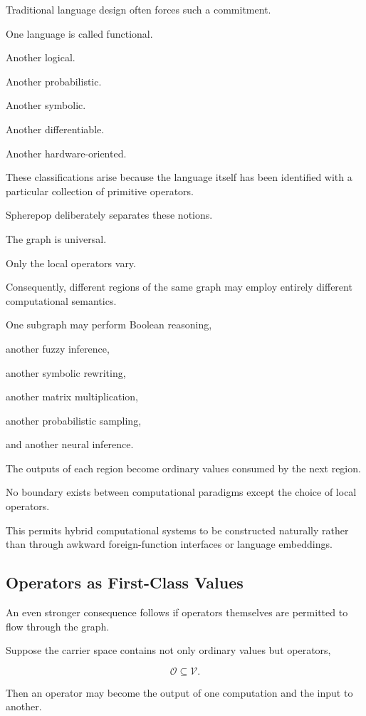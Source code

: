 \documentclass[12pt,oneside]{article}
\begin{document}
Traditional language design often forces such a commitment.

One language is called functional.

Another logical.

Another probabilistic.

Another symbolic.

Another differentiable.

Another hardware-oriented.

These classifications arise because the language itself has been identified with a particular collection of primitive operators.

Spherepop deliberately separates these notions.

The graph is universal.

Only the local operators vary.

Consequently, different regions of the same graph may employ entirely different computational semantics.

One subgraph may perform Boolean reasoning,

another fuzzy inference,

another symbolic rewriting,

another matrix multiplication,

another probabilistic sampling,

and another neural inference.

The outputs of each region become ordinary values consumed by the next region.

No boundary exists between computational paradigms except the choice of local operators.

This permits hybrid computational systems to be constructed naturally rather than through awkward foreign-function interfaces or language embeddings.

\subsection{Operators as First-Class Values}

An even stronger consequence follows if operators themselves are permitted to flow through the graph.

Suppose the carrier space contains not only ordinary values but operators,

\[
\mathcal O \subseteq \mathcal V.
\]

Then an operator may become the output of one computation and the input to another.
\end{document}
